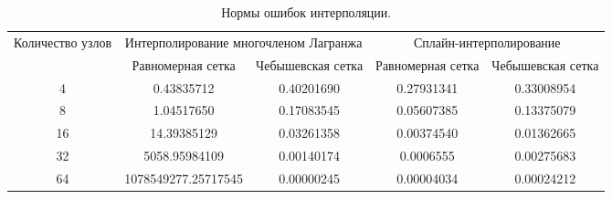 \documentclass[12pt, a4paper]{article}
\begin{document}
	\begin{table}[H]
		\caption{Нормы ошибок интерполяции.}
		\centering
		\footnotesize
		\begin{tabular}{|c|c|c|c|c|}
			\hline
			\multirow{2}{5em}{Количество узлов} & \multicolumn{2}{|c|}{Интерполирование многочленом Лагранжа}&\multicolumn{2}{|c|}{Сплайн-интерполирование}\\
			\cline{2-5}
			&Равномерная сетка &Чебышевская сетка &Равномерная сетка&Чебышевская сетка\\
			\hline
			4&0.43835712&0.40201690&0.27931341&0.33008954\\
			\hline
			8&1.04517650&0.17083545&0.05607385&0.13375079\\
			\hline
			16&14.39385129& 0.03261358&0.00374540&0.01362665\\
			\hline
			32&5058.95984109&0.00140174&0.0006555&0.00275683\\
			\hline
			64&1078549277.25717545&0.00000245&0.00004034&0.00024212\\
			\hline
			
		\end{tabular}
	\end{table}
	
\end{document}
